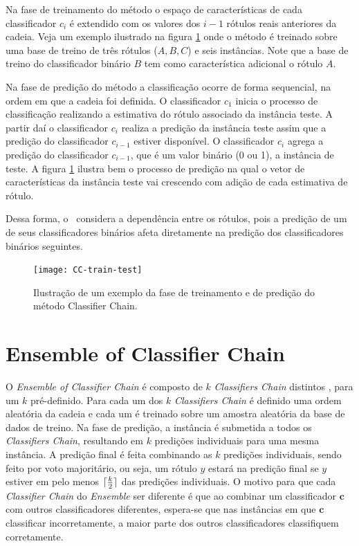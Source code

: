 Na fase de treinamento do método o espaço de características de cada classificador $c_i$ é 
extendido com os valores dos $i-1$ rótulos reais anteriores da cadeia. Veja um exemplo 
ilustrado na figura \ref{fig:CCtraintest} onde o método é treinado sobre uma base de treino de três rótulos ($A,B,C$)
e seis instâncias. Note que a base de treino do classificador binário $B$ tem como característica adicional o rótulo $A$.

Na fase de predição do método a classificação ocorre de forma sequencial, na ordem em que a cadeia foi definida.
O classificador $c_1$ inicia o processo de classificação realizando a estimativa do rótulo associado da instância teste.
A partir daí o classificador $c_i$ realiza a predição da instância teste assim que a predição do classificador $c_{i-1}$
estiver disponível. O classificador $c_i$ agrega a predição do classificador $c_{i-1}$, que é um valor binário (0 ou 1),
a instância de teste. A figura \ref{fig:CCtraintest} ilustra bem o processo de predição na qual o vetor de características da
instância teste vai crescendo com adição de cada estimativa de rótulo.

Dessa forma, o \CC~considera a dependência entre os rótulos, pois a predição de um de seus classificadores binários
afeta diretamente na predição dos classificadores binários seguintes.

\begin{figure}

 \texttt{[image: CC-train-test]}
 \caption{Ilustração de um exemplo da fase de treinamento e de predição do método Classifier Chain.}
\label{fig:CCtraintest}
\end{figure}

\FloatBarrier

\section{Ensemble of Classifier Chain}
O \textit{Ensemble of Classifier Chain} é composto de $k$ \textit{Classifiers Chain} distintos \cite{cc2009},
para um $k$ pré-definido.
Para cada um dos $k$ \textit{Classifiers Chain} é definido uma ordem aleatória da cadeia e
cada um é treinado sobre um amostra aleatória da base de dados de treino.
Na fase de predição, a instância é submetida a todos os \textit{Classifiers Chain}, resultando
em $k$ predições individuais para uma mesma instância. A predição final é feita combinando 
as $k$ predições individuais,
sendo feito por voto majoritário, ou seja, um rótulo $y$ estará na predição final se $y$ estiver
em pelo menos $\lceil\frac{k}{2}\rceil$ das predições individuais.
O motivo para que cada \textit{Classifier Chain} do \textit{Ensemble} ser diferente é que
ao combinar um classificador $\textbf{c}$ com outros classificadores diferentes,
espera-se que nas instâncias em que $\textbf{c}$ classificar incorretamente,
a maior parte dos outros classificadores classifiquem corretamente.


